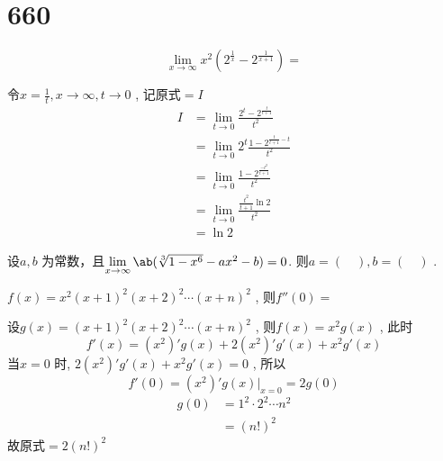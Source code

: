\section{660}

\begin{question}
    \begin{equation*}
        \lim_{x \to \infty} x^2 (2^{\frac{1}{x}} - 2^{\frac{1}{x + 1}}) = 
    \end{equation*}
\end{question}
\begin{solution}
    令$ x = \frac 1 t , x \to \infty, t \to 0 $ , 记原式$ = I $ 
    \begin{align*}
        I &= \lim_{t \to 0} \frac{ 2^t - 2^{ \frac{t}{t + 1} } }{t^2} \\
          &= \lim_{t \to 0} 2^t \frac{ 1 - 2^{ \frac{t}{t + 1} - t } }{t^2}  \\
          &= \lim_{t \to 0} \frac{ 1 - 2^{ \frac{-t^2}{t + 1} } }{t^2}   \\
          &= \lim_{t \to 0} \frac{ \frac{t^2}{t + 1} \ln2 }{t^2} \\
          &= \ln2
    \end{align*}
\end{solution}
\begin{question}
    设$ a, b $ 为常数，且$ \lim\limits_{x \to \infty} \ab(\sqrt[3]{1 - x^6} - ax^2 - b) = 0 $. 则$ a = (\quad), b = (\quad) $ . 
\end{question}
\begin{question}
    $ f(x) = x^2 (x + 1)^2 (x + 2)^2 \cdots (x + n)^2 $ , 则$ f''(0) =  $ 
\end{question}
\begin{solution}
    设$ g(x) =(x + 1)^2 (x + 2)^2 \cdots (x + n)^2 $ , 则$ f(x) = x^2 g(x) $ , 此时
    \begin{equation*}
        f'(x) = (x^2)' g(x) + 2(x^2)' g'(x) + x^2 g'(x)
    \end{equation*}
    当$ x = 0 $ 时,  $ 2(x^2)' g'(x) + x^2 g'(x) = 0 $ , 所以 
    \begin{equation*}
        f'(0) = (x^2)' g(x) \big| _{x = 0} = 2g(0)
    \end{equation*}
    \begin{align*}
        g(0) &= 1^2 \cdot 2^2 \cdots n^2     \\
        &= (n!)^2
    \end{align*}
    故原式$ = 2(n!)^2 $ 
\end{solution}
